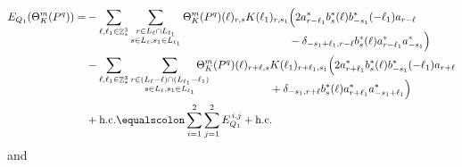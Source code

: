 \documentclass[sn-mathphys, Numbered ,a4paper]{sn-jnl}%
\DeclareMathOperator{\Z}{\mathbb{Z}}
\theoremstyle{plain}
\theoremstyle{definition}
\theoremstyle{remark}
\theoremstyle{plain}
\theoremstyle{definition}
\theoremstyle{remark}
\begin{document}
\begin{alignat}{2}
	E_{Q_1}(\Theta^m_{K}(P^q)) = &-
	\sum\limits_{\ell, \ell_1\in \Z^3_*}\sum\limits_{\substack{r\in L_{\ell} \cap L_{\ell_1}\\ s \in L_{\ell},s_1\in L_{\ell_1}}} \Theta^m_{K}(P^q)(\ell)_{r,s}K(\ell_1)_{r,s_1}
	\begin{aligned}[t]
		&\Big( 2a^*_{r-\ell_1}b^*_{s}(\ell) b^*_{-s_1}(-\ell_1)a_{r-\ell} \\ & -\delta_{-s_1+\ell_1,r-\ell} b^*_{s}(\ell) a^*_{r-\ell_1}a^*_{-s_1}\Big)
	\end{aligned}\nonumber\\
	& -\sum\limits_{\ell, \ell_1\in \Z^3_*}\sum\limits_{\substack{r\in (L_{\ell}-\ell) \cap (L_{\ell_1}-\ell_1)\\ s \in L_{\ell},s_1\in L_{\ell_1} }}\!\!\!\!\!\!\!\!\!
	\begin{aligned}[t] \Theta^m_{K}(P^q)(\ell)_{r+\ell,s}&K(\ell_1)_{r+\ell_1,s_1}
		\Big( 2a^*_{r+\ell_1}b^*_{s}(\ell) b^*_{-s_1}(-\ell_1) a_{r+\ell}\nonumber \\ &+ \delta_{-s_1,r+\ell} b^*_{s}(\ell) a^*_{r+\ell_1}a^*_{-s_1+\ell_1}\Big)
	\end{aligned}\\
	&+ \mathrm{h.c.} \equalscolon \sum\limits_{i=1}^{2}\sum\limits_{j=1}^{2} E_{Q_1}^{\,i,j} + \mathrm{h.c.}\nonumber
\end{alignat}
and
\end{document}
